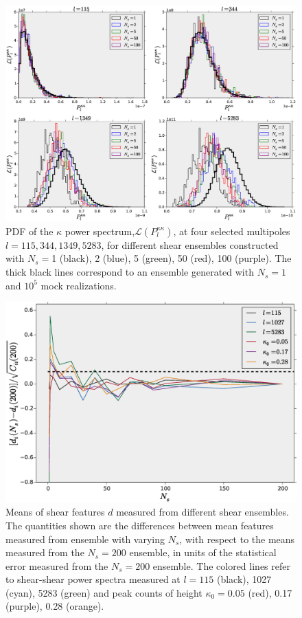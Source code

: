 \documentclass[reprint,aps,prd,superscriptaddress,showkeys,showpacs]{revtex4-1}
\begin{document}
\begin{figure}
\includegraphics[scale=0.4]{Figures/ps_pdf.eps}
\caption{PDF of the $\kappa$ power spectrum,$\mathcal{L}(P_l^{\kappa\kappa})$, at four selected multipoles $l=115,344,1349,5283$, for different shear ensembles constructed with $N_s=$1 (black), 2 (blue), 5 (green), 50 (red), 100 (purple). The thick black lines correspond to an ensemble generated with $N_s=1$ and $10^5$ mock realizations.}
\label{ps_pdf}
\end{figure}

\begin{figure}
\includegraphics[scale=0.3]{Figures/means_ns.eps}
\caption{Means of shear features $d$ measured from different shear ensembles. The quantities shown are the differences between mean features measured from ensemble with varying $N_s$, with respect to the means measured from the $N_s=200$ ensemble, in units of the statistical error measured from the $N_s=200$ ensemble. The colored lines refer to shear-shear power spectra measured at $l=115$ (black), 1027 (cyan), 5283 (green) and peak counts of height $\kappa_0=0.05$ (red), 0.17 (purple), 0.28 (orange).}
\label{means_ns}
\end{figure}
\end{document}
